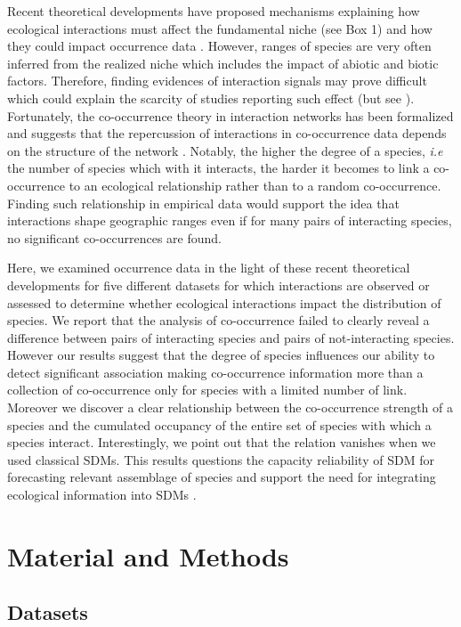 Recent theoretical developments have proposed mechanisms explaining how
ecological interactions must affect the fundamental niche (see Box 1)
and how they could impact occurrence data
\citep[\citet{Araujo2014}]{Holt_2009}. However, ranges of species are
very often inferred from the realized niche which includes the impact of
abiotic and biotic factors. Therefore, finding evidences of interaction
signals may prove difficult which could explain the scarcity of studies
reporting such effect (but see \citet{Gotelli_2010}). Fortunately, the
co-occurrence theory in interaction networks has been formalized and
suggests that the repercussion of interactions in co-occurrence data
depends on the structure of the network \citep{Cazelles_2015}. Notably,
the higher the degree of a species, \emph{i.e} the number of species
which with it interacts, the harder it becomes to link a co-occurrence
to an ecological relationship rather than to a random co-occurrence.
Finding such relationship in empirical data would support the idea that
interactions shape geographic ranges even if for many pairs of
interacting species, no significant co-occurrences are found.

Here, we examined occurrence data in the light of these recent
theoretical developments for five different datasets for which
interactions are observed or assessed to determine whether ecological
interactions impact the distribution of species. We report that the
analysis of co-occurrence failed to clearly reveal a difference between
pairs of interacting species and pairs of not-interacting species.
However our results suggest that the degree of species influences our
ability to detect significant association making co-occurrence
information more than a collection of co-occurrence only for species
with a limited number of link. Moreover we discover a clear relationship
between the co-occurrence strength of a species and the cumulated
occupancy of the entire set of species with which a species interact.
Interestingly, we point out that the relation vanishes when we used
classical SDMs. This results questions the capacity reliability of SDM
for forecasting relevant assemblage of species and support the need for
integrating ecological information into SDMs \citep{Cazelles_2015}.

\section{Material and Methods}\label{material-and-methods}

\subsection{Datasets}\label{datasets}

